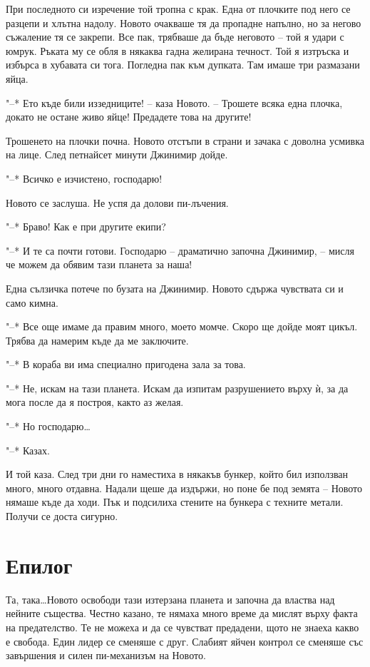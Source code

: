 \documentclass[ebook,openany,12pt]{memoir}
\begin{document}
При последното си изречение той тропна с крак. Една от плочките под него се разцепи и хлътна надолу. Новото очакваше тя да пропадне напълно, но за негово съжаление тя се закрепи. Все пак, трябваше да бъде неговото – той я удари с юмрук. Ръката му се обля в някаква гадна желирана течност. Той я изтръска и избърса в хубавата си тога. Погледна пак към дупката. Там имаше три размазани яйца.

"--* Ето къде били иззедниците! – каза Новото. – Трошете всяка една плочка, докато не остане живо яйце! Предадете това на другите!

Трошенето на плочки почна. Новото отстъпи в страни и зачака с доволна усмивка на лице. След петнайсет минути Джинимир дойде.

"--* Всичко е изчистено, господарю!

Новото се заслуша. Не успя да долови пи-лъчения.

"--* Браво! Как е при другите екипи?

"--* И те са почти готови. Господарю -- драматично започна Джинимир, – мисля че можем да обявим тази планета за наша!

Една сълзичка потече по бузата на Джинимир. Новото сдържа чувствата си и само кимна.

"--* Все още имаме да правим много, моето момче. Скоро ще дойде моят цикъл. Трябва да намерим къде да ме заключите.

"--* В кораба ви има специално пригодена зала за това.

"--* Не, искам на тази планета. Искам да изпитам разрушението върху ѝ, за да мога после да я построя, както аз желая.

"--* Но господарю\ldots 

"--* Казах.

И той каза. След три дни го наместиха в някакъв бункер, който бил използван много, много отдавна. Надали щеше да издържи, но поне бе под земята – Новото нямаше къде да ходи. Пък и подсилиха стените на бункера с техните метали. Получи се доста сигурно.

\chapter*{Епилог}

Та, така\ldots Новото освободи тази изтерзана планета и започна да властва над нейните същества. Честно казано, те нямаха много време да мислят върху факта на предателство. Те не можеха и да се чувстват предадени, щото не знаеха какво е свобода. Един лидер се сменяше с друг. Слабият яйчен контрол се сменяше със завършения и силен пи-механизъм на Новото.
\end{document}
